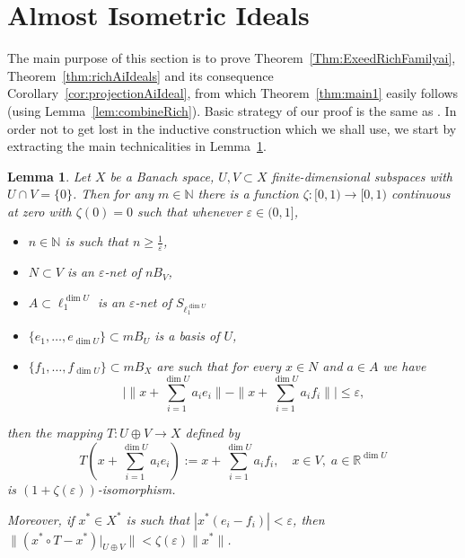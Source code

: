 \documentclass[11pt]{amsart}
\newtheorem{lemma}[thm]{Lemma}
\theoremstyle{definition}
\theoremstyle{remark}
\newcommand{\Rea}{\mathbb R}
\newcommand{\Nat}{\mathbb N}
\begin{document}
\section{Almost Isometric Ideals}\label{sec:aiIdeals}

The main purpose of this section is to prove Theorem~\ref{Thm:ExeedRichFamilyai}, Theorem~\ref{thm:richAiIdeals} and its consequence Corollary~\ref{cor:projectionAiIdeal}, from which Theorem~\ref{thm:main1} easily follows (using Lemma~\ref{lem:combineRich}). Basic strategy of our proof is the same as \cite[proof of Theorem 1.5]{Abr15}. In order not to get lost in the inductive construction which we shall use, we start by extracting the main technicalities in Lemma~\ref{lem:calculations}.

\begin{lemma}\label{lem:calculations}
Let $X$ be a Banach space, $U,V\subset X$ finite-dimensional subspaces with $U\cap V = \{0\}$. Then for any $m\in\Nat$ there is a function $\zeta:[0,1)\to[0,1)$ continuous at zero with $\zeta(0)=0$ such that whenever $\varepsilon\in (0,1]$,
\begin{itemize}
    \item $n\in\Nat$ is such that $n\geq \tfrac{1}{\varepsilon}$,
    \item $N\subset V$ is an $\varepsilon$-net of $nB_V$,
    \item $A\subset \ell_1^{\dim U}$ is an $\varepsilon$-net of $S_{\ell_1^{\dim U}}$
    \item $\{e_1,\ldots,e_{\dim U}\}\subset mB_U$ is a basis of $U$,
    \item $\{f_1,\ldots,f_{\dim U}\}\subset mB_X$ are such that for every $x\in N$ and $a\in A$ we have
        \[
            \Big|\|x+\sum_{i=1}^{\dim U}a_i e_i\| - \|x+\sum_{i=1}^{\dim U}a_i f_i\|\Big| \leq \varepsilon,
        \]
\end{itemize}
then the mapping $T:U\oplus V\to X$ defined by 
\[
T(x+\sum_{i=1}^{\dim U}a_i e_i):=x+\sum_{i=1}^{\dim U}a_i f_i,\quad x\in V,\; a\in \Rea^{\dim U}
\]
is $(1+\zeta(\varepsilon))$-isomorphism.

Moreover, if $x^*\in X^*$ is such that $|x^*(e_i-f_i)|<\varepsilon$, then $\|(x^*\circ T - x^*)|_{U\oplus V}\| < \zeta(\varepsilon)\|x^*\|$.
\end{lemma}
\end{document}
